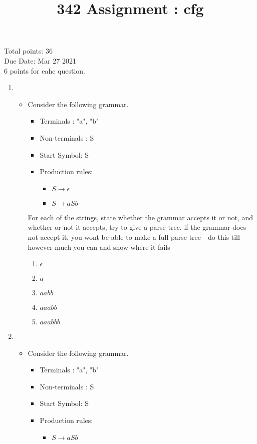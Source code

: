 \documentclass[10pt]{article}
\title{342 Assignment : cfg}
\begin{document}
\maketitle

Total points: 36\\
Due Date: Mar  $27$ 2021\\

6 points for eahc question.
\begin{enumerate}
    \item
\begin{itemize}
    \item Consider the following grammar. \\
    \begin{itemize}
        \item Terminals : "a", "b"
        \item Non-terminals : S
        \item Start Symbol: S
        \item Production rules:
        \begin{itemize}
            \item $S \rightarrow \epsilon$
            \item $S \rightarrow aSb$
        \end{itemize}
    \end{itemize}

    For each of the strings, state whether the grammar accepts it or not, and whether or not it accepts, try to give a parse tree. if the grammar does not accept it, you wont be able to make a full parse tree - do this till however much you can and show where it fails
    \begin{enumerate}
        \item $\epsilon$
        \item $a$
        \item $aabb$
        \item $aaabb$
        \item $aaabbb$
    \end{enumerate}
\end{itemize}


\item
\begin{itemize}
    \item Consider the following grammar. \\
    \begin{itemize}
        \item Terminals : "a", "b"
        \item Non-terminals : S
        \item Start Symbol: S
        \item Production rules:
        \begin{itemize}
            \item $S \rightarrow aSb$
        \end{itemize}
    \end{itemize}


\end{itemize}
\end{enumerate}
\end{document}
